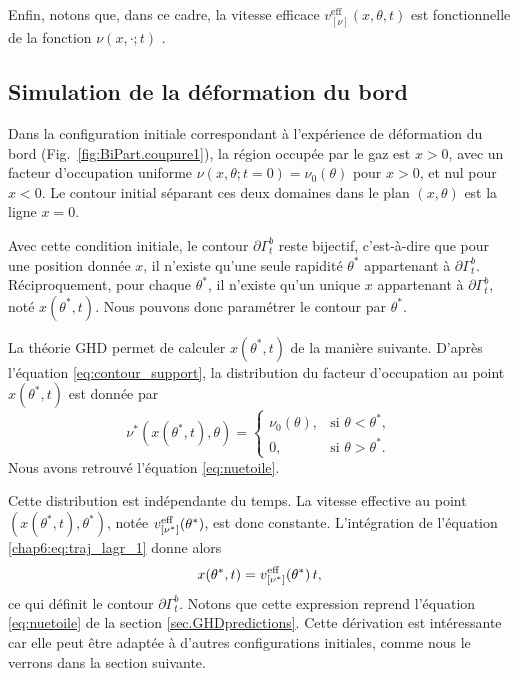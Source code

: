 Enfin, notons que, dans ce cadre, la vitesse efficace $v^{\mathrm{eff}}_{[\nu]}(x,\theta,t)$ est fonctionnelle de la fonction $\nu(x , \cdot ;t )$ . %


\subsection{Simulation de la déformation du bord}


Dans la configuration initiale correspondant à l’expérience de déformation du bord (Fig.~\ref{fig:BiPart.coupure1}), la région occupée par le gaz est $x>0$, avec un facteur d’occupation uniforme \(\nu(x,\theta;t=0)=\nu_0(\theta)\) pour \(x>0\), et nul pour \(x<0\). Le contour initial séparant ces deux domaines dans le plan \((x,\theta)\) est la ligne $x=0$.

\medskip

Avec cette condition initiale, le contour \(\partial\Gamma_t^b\) reste bijectif, c’est-à-dire que pour une position donnée $x$, il n’existe qu’une seule rapidité \(\theta^*\) appartenant à \(\partial\Gamma_t^b\). Réciproquement, pour chaque \(\theta^*\), il n’existe qu’un unique $x$ appartenant à \(\partial\Gamma_t^b\), noté \(x(\theta^*,t)\). 
Nous pouvons donc paramétrer le contour par \(\theta^*\). 

\medskip

La théorie \gls*{GHD} permet de calculer \(x(\theta^*,t)\) de la manière suivante. D’après l’équation \eqref{eq:contour_support}, la distribution du facteur d’occupation au point \(x(\theta^*,t)\) est donnée par
\begin{equation}
\nu^*(x(\theta^*,t) , \theta) =
\begin{cases}
\nu_0(\theta), & \text{si } \theta < \theta^*,\\
0, & \text{si } \theta > \theta^*.
\end{cases}
\end{equation}
Nous avons retrouvé l'équation \eqref{eq:nuetoile}.

\medskip

Cette distribution est indépendante du temps. La vitesse effective au point \((x(\theta^*,t),\theta^*)\), notée \(v^{\rm eff}_{[\nu^*]}(\theta^*)\), est donc constante. L’intégration de l’équation \eqref{chap6:eq:traj_lagr_1} donne alors
\begin{equation}
x(\theta^*,t) =  v^{\rm eff}_{[\nu^*]}(\theta^*) \, t ,
\end{equation}
ce qui définit le contour \(\partial\Gamma_t^b\). Notons que cette expression reprend l’équation \eqref{eq:nuetoile} de la section \ref{sec.GHDpredictions}. Cette dérivation est intéressante car elle peut être adaptée à d’autres configurations initiales, comme nous le verrons dans la section suivante.

